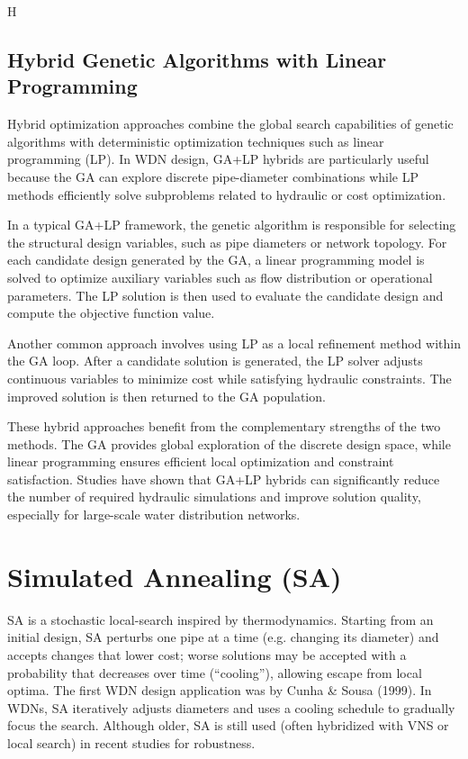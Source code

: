 H\documentclass[12pt, a4paper]{article}
\begin{document}
\subsection*{Hybrid Genetic Algorithms with Linear Programming}

Hybrid optimization approaches combine the global search capabilities of genetic algorithms with deterministic optimization techniques such as linear programming (LP). In WDN design, GA+LP hybrids are particularly useful because the GA can explore discrete pipe-diameter combinations while LP methods efficiently solve subproblems related to hydraulic or cost optimization.

In a typical GA+LP framework, the genetic algorithm is responsible for selecting the structural design variables, such as pipe diameters or network topology. For each candidate design generated by the GA, a linear programming model is solved to optimize auxiliary variables such as flow distribution or operational parameters. The LP solution is then used to evaluate the candidate design and compute the objective function value.

Another common approach involves using LP as a local refinement method within the GA loop. After a candidate solution is generated, the LP solver adjusts continuous variables to minimize cost while satisfying hydraulic constraints. The improved solution is then returned to the GA population.

These hybrid approaches benefit from the complementary strengths of the two methods. The GA provides global exploration of the discrete design space, while linear programming ensures efficient local optimization and constraint satisfaction. Studies have shown that GA+LP hybrids can significantly reduce the number of required hydraulic simulations and improve solution quality, especially for large-scale water distribution networks.

\section*{Simulated Annealing (SA)}
SA is a stochastic local-search inspired by thermodynamics. Starting from an initial design, SA perturbs one pipe at a time (e.g. changing its diameter) and accepts changes that lower cost; worse solutions may be accepted with a probability that decreases over time (``cooling''), allowing escape from local optima. The first WDN design application was by Cunha \& Sousa (1999)\cite{ref4}. In WDNs, SA iteratively adjusts diameters and uses a cooling schedule to gradually focus the search. Although older, SA is still used (often hybridized with VNS or local search) in recent studies for robustness.
\end{document}
